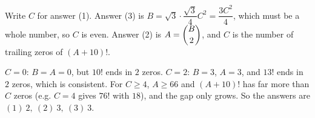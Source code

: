 Write $C$ for answer (1). Answer (3) is $B=\sqrt3\cdot\dfrac{\sqrt3}4C^2=\dfrac{3C^2}4$, which must be a whole number, so $C$ is even. Answer (2) is $A=\dbinom B2$, and $C$ is the number of trailing zeros of $(A+10)!$.

$C=0$: $B=A=0$, but $10!$ ends in $2$ zeros. $C=2$: $B=3$, $A=3$, and $13!$ ends in $2$ zeros, which is consistent. For $C\ge4$, $A\ge66$ and $(A+10)!$ has far more than $C$ zeros (e.g. $C=4$ gives $76!$ with $18$), and the gap only grows. So the answers are $\boxed{(1)\ 2,\ (2)\ 3,\ (3)\ 3}$.
